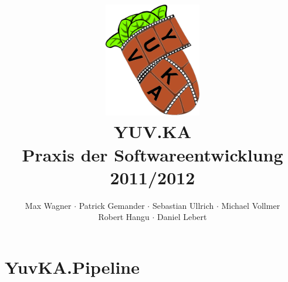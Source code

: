 \documentclass{scrartcl}
\begin{document}
\title{
    \hspace{-0.5cm} \includegraphics[height=5cm]{logo.png} \\[1cm]
    \Huge{YUV.KA} \\ \large{Praxis der Softwareentwicklung 2011/2012}
}
\author{Max Wagner $\cdot$ Patrick Gemander $\cdot$ Sebastian Ullrich $\cdot$ Michael Vollmer \\ Robert Hangu $\cdot$ Daniel Lebert}
\maketitle

\newpage
\mbox{}
\newpage
\mbox{}

\tableofcontents
\newpage
\mbox{}
\newpage
\section{YuvKA.Pipeline}



\end{document}
